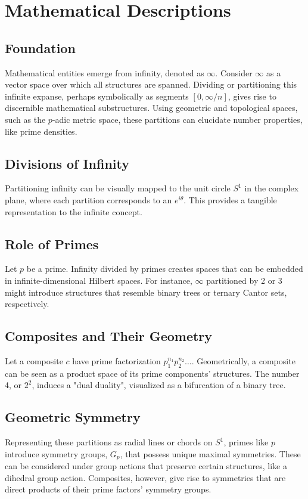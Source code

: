 \documentclass{article}
\begin{document}
\section*{Mathematical Descriptions}

\subsection*{Foundation}
Mathematical entities emerge from infinity, denoted as \( \infty \). Consider \( \infty \) as a vector space over which all structures are spanned. Dividing or partitioning this infinite expanse, perhaps symbolically as segments \([0, \infty/n]\), gives rise to discernible mathematical substructures. Using geometric and topological spaces, such as the \( p \)-adic metric space, these partitions can elucidate number properties, like prime densities.

\subsection*{Divisions of Infinity}
Partitioning infinity can be visually mapped to the unit circle \( S^1 \) in the complex plane, where each partition corresponds to an \( e^{i\theta} \). This provides a tangible representation to the infinite concept.

\subsection*{Role of Primes}
Let \( p \) be a prime. Infinity divided by primes creates spaces that can be embedded in infinite-dimensional Hilbert spaces. For instance, \( \infty \) partitioned by 2 or 3 might introduce structures that resemble binary trees or ternary Cantor sets, respectively.

\subsection*{Composites and Their Geometry}
Let a composite \( c \) have prime factorization \( p_1^{n_1}p_2^{n_2}\ldots \). Geometrically, a composite can be seen as a product space of its prime components' structures. The number 4, or \( 2^2 \), induces a "dual duality", visualized as a bifurcation of a binary tree.

\subsection*{Geometric Symmetry}
Representing these partitions as radial lines or chords on \( S^1 \), primes like \( p \) introduce symmetry groups, \( G_p \), that possess unique maximal symmetries. These can be considered under group actions that preserve certain structures, like a dihedral group action. Composites, however, give rise to symmetries that are direct products of their prime factors' symmetry groups.
\end{document}

